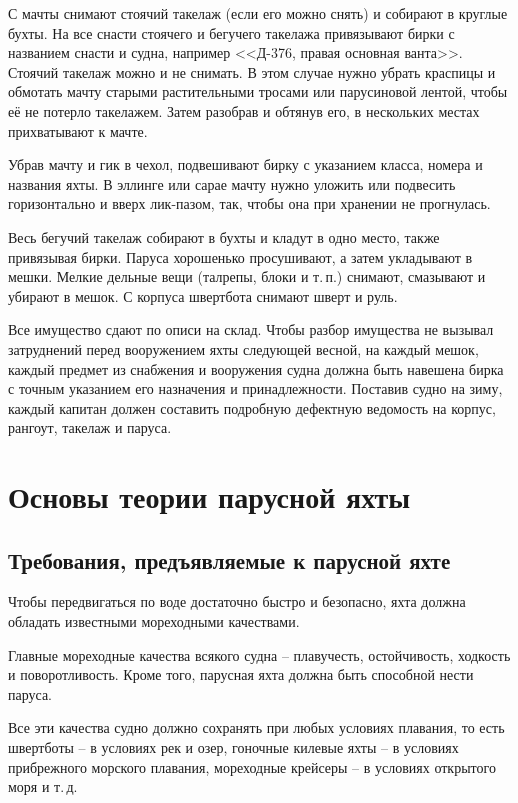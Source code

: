 \documentclass[a4paper, 12pt, twoside, final]{scrbook}
\begin{document}
С мачты снимают стоячий такелаж (если его можно снять) и собирают в круглые бухты. На все снасти стоячего и бегучего такелажа привязывают бирки с названием снасти и судна, например <<Д-376, правая основная ванта>>. Стоячий такелаж можно и не снимать. В этом случае нужно убрать краспицы и обмотать мачту старыми растительными тросами или парусиновой лентой, чтобы её не потерло такелажем. Затем разобрав и обтянув его, в нескольких местах прихватывают к мачте. 

Убрав мачту и гик в чехол, подвешивают бирку с указанием класса, номера и названия яхты. В эллинге или сарае мачту нужно уложить или подвесить горизонтально и вверх лик-пазом, так, чтобы она при хранении не прогнулась. 

Весь бегучий такелаж собирают в бухты и кладут в одно место, также привязывая бирки. Паруса хорошенько просушивают, а затем укладывают в мешки. Мелкие дельные вещи (талрепы, блоки и т.\,п.) снимают, смазывают и убирают в мешок. С корпуса швертбота снимают шверт и руль. 

Все имущество сдают по описи на склад. Чтобы разбор имущества не вызывал затруднений перед вооружением яхты следующей весной, на каждый мешок, каждый предмет из снабжения и вооружения судна должна быть навешена бирка с точным указанием его назначения и принадлежности. 
Поставив судно на зиму, каждый капитан должен составить подробную дефектную ведомость на корпус, рангоут, такелаж и паруса.

\chapter{Основы теории парусной яхты}

\section{Требования, предъявляемые к парусной яхте}

Чтобы передвигаться по воде достаточно быстро и безопасно, яхта должна обладать известными мореходными качествами.

Главные мореходные качества всякого судна \--- плавучесть, остойчивость, ходкость и поворотливость. Кроме того, парусная яхта должна быть способной нести паруса.

Все эти качества судно должно сохранять при любых условиях плавания, то есть швертботы \--- в условиях рек и озер, гоночные килевые яхты \--- в условиях прибрежного морского плавания, мореходные крейсеры \--- в условиях открытого моря и т.\,д.
\end{document}

